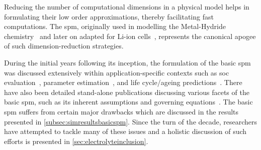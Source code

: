 

Reducing  the   number  of   computational  dimensions   in  a   physical  model
helps  in  formulating  their  low order  approximations,  thereby  facilitating
fast   computations.   The  \gls{spm},   originally   used   in  modelling   the
Metal-Hydride    chemistry~\cite{Haran1998}   and    later   on    adapted   for
Li-ion   cells~\cite{Ning2004},  represents   the  canonical   apogee  of   such
dimension-reduction strategies.


During  the  initial years  following  its  inception,  the formulation  of  the
basic \gls{spm}  was discussed extensively within  application-specific contexts
such  as  \gls{soc}  evaluation~\cite{Santhanagopalan2006a,Santhanagopalan2008},
parameter    estimation~\cite{Santhanagopalan2007},   and    life   cycle/ageing
predictions~\cite{Santhanagopalan2008a,Safari2009}.   There   have   also   been
detailed   stand-alone   publications   discussing   various   facets   of   the
basic   \gls{spm},   such   as    its   inherent   assumptions   and   governing
equations~\cite{Santhanagopalan2006,Chaturvedi2010}. The basic \gls{spm} suffers
from certain  major drawbacks which  are discussed  in the results  presented in
\cref{subsec:simresultsbasicspm}. Since the turn of the decade, researchers have
attempted  to tackle  many of  these issues  and a  holistic discussion  of such
efforts is presented in \cref{sec:electrolyteinclusion}.

